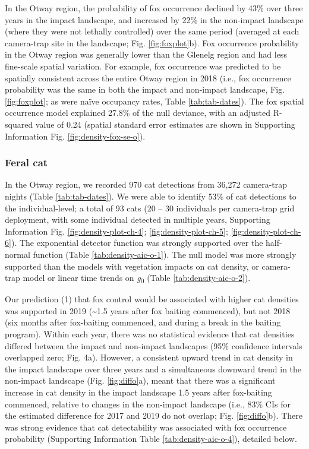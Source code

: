 \documentclass[preprint, 3p, authoryear]{elsarticle} %
\begin{document}
In the Otway region, the probability of fox occurrence declined by 43\% over three years in the impact landscape, and increased by 22\% in the non-impact landscape (where they were not lethally controlled) over the same period (averaged at each camera-trap site in the landscape; Fig. \ref{fig:foxplot}b). Fox occurrence probability in the Otway region was generally lower than the Glenelg region and had less fine-scale spatial variation. For example, fox occurrence was predicted to be spatially consistent across the entire Otway region in 2018 (i.e., fox occurrence probability was the same in both the impact and non-impact landscape, Fig. \ref{fig:foxplot}; as were naïve occupancy rates, Table \ref{tab:tab-dates}). The fox spatial occurrence model explained 27.8\% of the null deviance, with an adjusted R-squared value of 0.24 (spatial standard error estimates are shown in Supporting Information Fig. \ref{fig:density-fox-se-o}).

\hypertarget{feral-cat-1}{%
\subsubsection{Feral cat}\label{feral-cat-1}}

In the Otway region, we recorded 970 cat detections from 36,272 camera-trap nights (Table \ref{tab:tab-dates}). We were able to identify 53\% of cat detections to the individual-level; a total of 93 cats (20 -- 30 individuals per camera-trap grid deployment, with some individual detected in multiple years, Supporting Information Fig. \ref{fig:density-plot-ch-4}; \ref{fig:density-plot-ch-5}; \ref{fig:density-plot-ch-6}). The exponential detector function was strongly supported over the half-normal function (Table \ref{tab:density-aic-o-1}). The null model was more strongly supported than the models with vegetation impacts on cat density, or camera-trap model or linear time trends on \emph{g}\textsubscript{0} (Table \ref{tab:density-aic-o-2}).

Our prediction (1) that fox control would be associated with higher cat densities was supported in 2019 (\textasciitilde1.5 years after fox baiting commenced), but not 2018 (six months after fox-baiting commenced, and during a break in the baiting program). Within each year, there was no statistical evidence that cat densities differed between the impact and non-impact landscapes (95\% confidence intervals overlapped zero; Fig. 4a). However, a consistent upward trend in cat density in the impact landscape over three years and a simultaneous downward trend in the non-impact landscape (Fig. \ref{fig:diffo}a), meant that there was a significant increase in cat density in the impact landscape 1.5 years after fox-baiting commenced, relative to changes in the non-impact landscape (i.e., 83\% CIs for the estimated difference for 2017 and 2019 do not overlap; Fig. \ref{fig:diffo}b). There was strong evidence that cat detectability was associated with fox occurrence probability (Supporting Information Table \ref{tab:density-aic-o-4}), detailed below.
\end{document}
